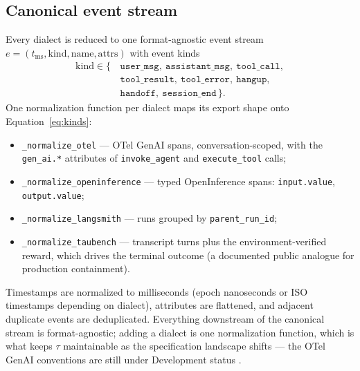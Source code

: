 \subsection{Canonical event stream}
Every dialect is reduced to one format-agnostic event stream
$e = (t_{\mathrm{ms}}, \mathrm{kind}, \mathrm{name}, \mathrm{attrs})$ with event kinds
\begin{equation}
\begin{aligned}
\mathrm{kind} \in \{\,&\texttt{user\_msg},\ \texttt{assistant\_msg},\ \texttt{tool\_call},\\
&\texttt{tool\_result},\ \texttt{tool\_error},\ \texttt{hangup},\\
&\texttt{handoff},\ \texttt{session\_end}\,\}.
\end{aligned}
\label{eq:kinds}
\end{equation}
One normalization function per dialect maps its export shape onto
Equation~\eqref{eq:kinds}:
\begin{itemize}
  \item \texttt{\_normalize\_otel} --- OTel GenAI spans, conversation-scoped, with the
        \texttt{gen\_ai.*} attributes of \texttt{invoke\_agent} and
        \texttt{execute\_tool} calls;
  \item \texttt{\_normalize\_openinference} --- typed OpenInference spans:
        \texttt{input.value}, \texttt{output.value};
  \item \texttt{\_normalize\_langsmith} --- runs grouped by \texttt{parent\_run\_id};
  \item \texttt{\_normalize\_taubench} --- transcript turns plus the environment-verified
        reward, which drives the terminal outcome (a documented public analogue for
        production containment).
\end{itemize}
Timestamps are normalized to milliseconds (epoch nanoseconds or ISO timestamps depending on
dialect), attributes are flattened, and adjacent duplicate events are deduplicated.
Everything downstream of the canonical stream is format-agnostic; adding a dialect is one
normalization function, which is what keeps $\tau$ maintainable as the specification landscape
shifts --- the OTel GenAI conventions are still under Development status
\citep{otelgenai2026}.

